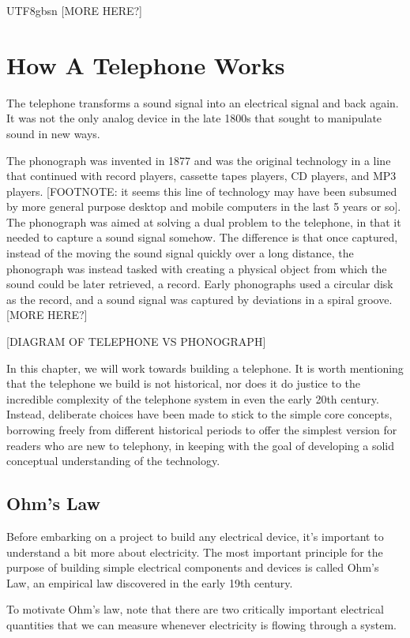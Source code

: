 \documentclass[UTF8]{book}
\begin{document}
\begin{CJK}{UTF8}{gbsn}
[MORE HERE?]

\chapter{How A Telephone Works}

The telephone transforms a sound signal into an electrical signal and back again. It was not the only analog device in the late 1800s that sought to manipulate sound in new ways.

The phonograph was invented in 1877 and was the original technology in a line that continued with record players, cassette tapes players, CD players, and MP3 players. [FOOTNOTE: it seems this line of technology may have been subsumed by more general purpose desktop and mobile computers in the last 5 years or so]. The phonograph was aimed at solving a dual problem to the telephone, in that it needed to capture a sound signal somehow. The difference is that once captured, instead of the moving the sound signal quickly over a long distance, the phonograph was instead tasked with creating a physical object from which the sound could be later retrieved, a record. Early phonographs used a circular disk as the record, and a sound signal was captured by deviations in a spiral groove. [MORE HERE?]

[DIAGRAM OF TELEPHONE VS PHONOGRAPH]

In this chapter, we will work towards building a telephone. It is worth mentioning that the telephone we build is not historical, nor does it do justice to the incredible complexity of the telephone system in even the early 20th century. Instead, deliberate choices have been made to stick to the simple core concepts, borrowing freely from different historical periods to offer the simplest version for readers who are new to telephony, in keeping with the goal of developing a solid conceptual understanding of the technology.

\section{Ohm's Law}

Before embarking on a project to build any electrical device, it's important to understand a bit more about electricity. The most important principle for the purpose of building simple electrical components and devices is called Ohm's Law, an empirical law discovered in the early 19th century.

To motivate Ohm's law, note that there are two critically important electrical quantities that we can measure whenever electricity is flowing through a system.


\end{CJK}
\end{document}
